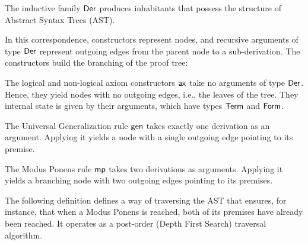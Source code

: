 \begin{rem}
    The inductive family $\mathsf{Der}$ produces inhabitants that possess the structure of Abstract Syntax Trees (AST). 
    
    In this correspondence, constructors represent nodes, and recursive arguments of type $\mathsf{Der}$ represent outgoing edges from the parent node to a sub-derivation. The constructors build the branching of the proof tree:
    \begin{description}[font=\normalfont\scshape] 
        \item[Leaves:] The logical and non-logical axiom constructors $\mathsf{ax}$ take no arguments of type $\mathsf{Der}$. Hence, they yield nodes with no outgoing edges, i.e., the leaves of the tree. They internal state is given by their arguments, which have types $\mathsf{Term}$ and $\mathsf{Form}$.
        
        \item[Unary Branches:] The Universal Generalization rule $\mathsf{gen}$ takes exactly one derivation as an argument. Applying it yields a node with a single outgoing edge pointing to its premise.
        
        \item[Binary Branches] The Modus Ponens rule $\mathsf{mp}$ takes two derivations as arguments. Applying it yields a branching node with two outgoing edges pointing to its premises.
    \end{description}
    The following definition defines a way of traversing the AST that ensures, for instance, that when a Modus Ponens is reached, both of its premises have already been reached. It operates as a post-order (Depth First Search) traversal algorithm.
\end{rem}

